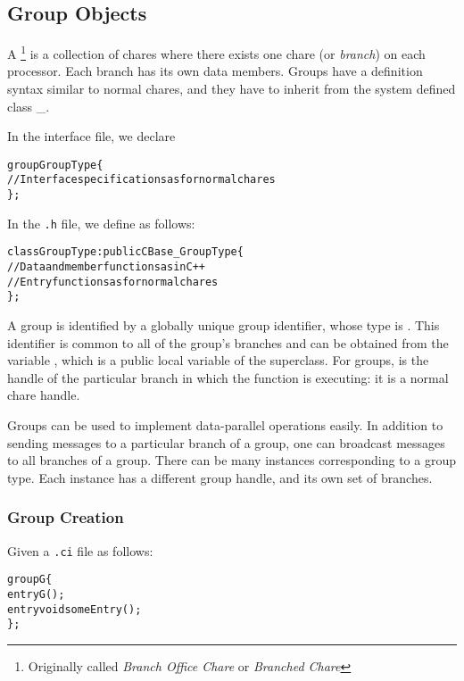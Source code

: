 \subsection{Group Objects}
\label{sec:group}

A \footnote{Originally called {\em Branch Office Chare} or 
{\em Branched Chare}} is a collection of chares where 
there exists one chare (or {\sl branch}) on each
processor.   Each branch has its own data members.  Groups have
a definition syntax similar to normal chares,
and they have to inherit from the system defined class \_.

In the interface file, we declare

\begin{alltt}
 group GroupType \{
   // Interface specifications as for normal chares
 \};
\end{alltt}

In the \texttt{.h} file, we define  as follows:

\begin{alltt}
 class GroupType : public CBase\_GroupType \{
  // Data and member functions as in C++
  // Entry functions as for normal chares
 \};
\end{alltt}

A group is identified by a globally unique group identifier, whose type is
. This identifier is common to all of the group's branches and
can be obtained from the variable , which is a public local
variable of the  superclass.  For groups,  is the
handle of the particular branch in which the function is executing: it is a
normal chare handle.

Groups can be used to implement data-parallel operations easily.  In addition
to sending messages to a particular branch of a group, one can broadcast
messages to all branches of a group.  There can be many instances corresponding
to a group type.  Each instance has a different group handle, and its own set
of branches.

\subsubsection{Group Creation}

Given a \texttt{.ci} file as follows:

\begin{alltt}
group G \{
  entry G();
  entry void someEntry();
\};
\end{alltt}

